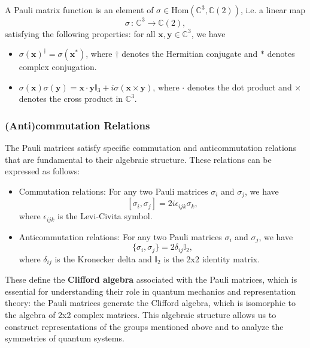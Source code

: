 \begin{definition}
    A Pauli matrix function is an element of \(\sigma \in \mathrm{Hom}(\mathbb{C}^3, \mathbb{C}(2))\), i.e. a linear map
    \[
        \sigma \, : \, \mathbb{C}^3 \to \mathbb{C}(2),
    \]
    satisfying the following properties: for all \(\mathbf{x}, \mathbf{y} \in \mathbb{C}^3\), we have
    \begin{itemize}
        \item \(\sigma(\mathbf{x})^{\dagger} = \sigma(\mathbf{x}^*)\), where \(\dagger\) denotes the Hermitian conjugate and \(*\) denotes complex conjugation.
        \item \(\sigma(\mathbf{x}) \sigma(\mathbf{y}) = \mathbf{x} \cdot \mathbf{y} \mathbb{I}_3 + i \sigma (\mathbf{x} \times \mathbf{y})\), where \(\cdot\) denotes the dot product and \(\times\) denotes the cross product in \(\mathbb{C}^3\).
    \end{itemize}
\end{definition}

\subsubsection{(Anti)commutation Relations}

The Pauli matrices satisfy specific commutation and anticommutation relations that are fundamental to their algebraic structure. These relations can be expressed as follows:
\begin{itemize}
    \item Commutation relations: For any two Pauli matrices \(\sigma_i\) and \(\sigma_j\), we have
          \[
              [\sigma_i, \sigma_j] = 2i \epsilon_{ijk} \sigma_k,
          \]
          where \(\epsilon_{ijk}\) is the Levi-Civita symbol.

    \item Anticommutation relations: For any two Pauli matrices \(\sigma_i\) and \(\sigma_j\), we have
          \[
              \{\sigma_i, \sigma_j\} = 2\delta_{ij} \mathbb{I}_2,
          \]
          where \(\delta_{ij}\) is the Kronecker delta and \(\mathbb{I}_2\) is the 2x2 identity matrix.
\end{itemize}

These define the \textbf{Clifford algebra} associated with the Pauli matrices, which is essential for understanding their role in quantum mechanics and representation theory: the Pauli matrices generate the Clifford algebra, which is isomorphic to the algebra of 2x2 complex matrices. This algebraic structure allows us to construct representations of the groups mentioned above and to analyze the symmetries of quantum systems.

